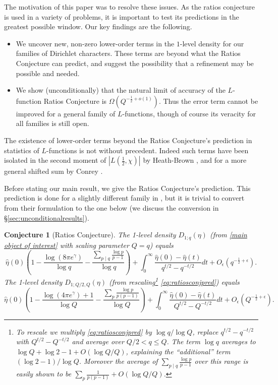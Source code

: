 \documentclass[12pt,reqno]{amsart}
\numberwithin{equation}{section}
\theoremstyle{plain}
\newtheorem{conjecture}[thm]{Conjecture}
\begin{document}
The motivation of this paper was to resolve these issues. As the ratios conjecture is used in a variety of problems, it is important to test its predictions in the greatest possible window. Our key findings are the following.

\begin{itemize}
\item We uncover new, non-zero lower-order terms in the $1$-level density for our families of Dirichlet characters. These terms are beyond what the Ratios Conjecture can predict, and suggest the possibility that a refinement may be possible and needed.

\item We show (unconditionally) that the natural limit of accuracy of the $L$-function Ratios Conjecture is $\Omega(Q^{-\frac 12+o(1)})$. Thus the error term cannot be improved for a general family of $L$-functions, though of course its veracity for all families is still open.
\end{itemize}

The existence of lower-order terms beyond the Ratios Conjecture's prediction in statistics of $L$-functions is not without precedent. Indeed such terms have been isolated in the second moment of $|L(\tfrac 12,\chi)|$ by Heath-Brown \cite{HB}, and for a more general shifted sum by Conrey \cite{C}.

Before stating our main result, we give the Ratios Conjecture's prediction. This prediction is done for a slightly different family in \cite{GJMMNPP}, but it is trivial to convert from their formulation to the one below (we discuss the conversion in \S\ref{sec:unconditionalresults}).

\begin{conjecture}[Ratios Conjecture]\label{conj:ratiosconj}
The 1-level density $D_{1;q}(\eta)$ (from \eqref{main object of interest} with scaling parameter $Q=q$) equals
\begin{equation}\label{eq:ratiosconjpred} \widehat{\eta}(0) \left(  1-\frac { \log(8\pi e^{\gamma})}{\log q}-\frac{\sum_{p\mid q}\frac{\log p}{p-1}}{\log q}\right) +\int_0^{\infty}\frac{\widehat{\eta}(0)-\widehat{\eta}(t)}{q^{t/2}-q^{-t/2}} dt + O_{\epsilon}\left(q^{-\frac{1}2+\epsilon}\right). \end{equation} The 1-level density $D_{1;Q/2,Q}(\eta)$ (from rescaling\footnote{\label{footnote:rescaling} To rescale we multiply \eqref{eq:ratiosconjpred} by $\log q/\log Q$, replace $q^{t/2}-q^{-t/2}$ with $Q^{t/2}-Q^{-t/2}$ and average over $Q/2 < q \leq Q$. The term $\log q$ averages to $\log Q +\log 2 -1+O(\log Q/Q)$, explaining the ``additional'' term $(\log 2-1)/\log Q$. Moreover the average of $\sum_{p\mid q} \frac{\log p}{p-1}$ over this range is easily shown to be $\sum_{p} \frac 1{p(p-1)} +O(\log Q/Q)$.}  \eqref{eq:ratiosconjpred}) equals \begin{equation} \widehat{\eta}(0) \left( 1 -\frac{\log(4\pi e^{\gamma})+1}{\log Q} - \frac{\sum_p \frac{\log p}{p(p-1)} }{\log Q}\right) + \int_0^{\infty}\frac{\widehat{\eta}(0) - \widehat{\eta}(t)}{Q^{t/2}-Q^{-t/2}} dt + O_{\epsilon}\left(Q^{-\frac{1}2+\epsilon}\right). \end{equation}
\end{conjecture}
\end{document}
